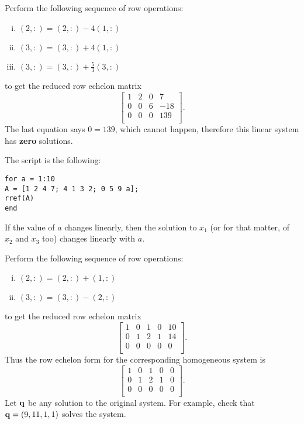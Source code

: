 \vspace{2mm}
Perform the following sequence of row operations:
\begin{enumerate}[i)]
\item $(2,:) = (2,:) - 4(1,:)$
\item $(3,:) = (3,:) + 4(1,:)$
\item $(3,:) = (3,:) + \frac{5}{3}(3,:)$
\end{enumerate}
to get the reduced row echelon matrix
$$
\left[\begin{array}{ccc|c}
     1 & 2 & 0 & 7 \\
		 0 & 0 & 6 & -18\\
		 0 & 0 & 0  & 139\\
      \end{array}\right].
$$
The last equation says $0=139$, which cannot happen, therefore this linear system has \textbf{zero} solutions.

\vspace{2mm}
The script is the following:
\begin{verbatim}
for a = 1:10
A = [1 2 4 7; 4 1 3 2; 0 5 9 a];
rref(A)
end
\end{verbatim}
If the value of $a$ changes linearly, then the solution to $x_1$ (or for that matter, of $x_2$ and $x_3$ too) changes linearly with $a$.

\vspace{2mm}
Perform the following sequence of row operations:
\begin{enumerate}[i)]
\item $(2,:) = (2,:) + (1,:)$
\item $(3,:) = (3,:) - (2,:)$
\end{enumerate}
to get the reduced row echelon matrix
$$
\left[\begin{array}{cccc|c}
     1 & 0 & 1 & 0 & 10 \\
		 0 & 1 & 2 & 1 & 14\\
		 0 & 0 & 0 & 0 & 0\\
      \end{array}\right].
$$
Thus the row echelon form for the corresponding homogeneous system is
$$
\left[\begin{array}{cccc|c}
     1 & 0 & 1 & 0 & 0 \\
		 0 & 1 & 2 & 1 & 0\\
		 0 & 0 & 0 & 0 & 0\\
      \end{array}\right].
$$
Let ${\bf q}$ be any solution to the original system. For example, check that ${\bf q} = (9,11,1,1)$ solves the system.

